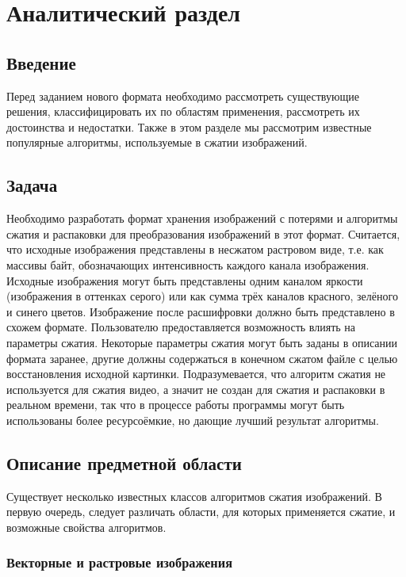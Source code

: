 \documentclass[a4paper,12pt]{article}
\numberwithin{equation}{section}
\begin{document}
\section{Аналитический раздел}

\subsection{Введение}

Перед заданием нового формата необходимо рассмотреть существующие решения,
классифицировать их по областям применения, рассмотреть их достоинства и
недостатки. Также в этом разделе мы рассмотрим известные популярные алгоритмы,
используемые в сжатии изображений.

\subsection{Задача}

Необходимо разработать формат хранения изображений с потерями и алгоритмы сжатия и
распаковки для преобразования изображений в этот формат. Считается, что исходные
изображения представлены в несжатом растровом виде, т.е. как массивы байт,
обозначающих интенсивность каждого канала изображения. Исходные изображения
могут быть представлены одним каналом яркости (изображения в оттенках серого)
или как сумма трёх каналов красного, зелёного и синего цветов. Изображение после
расшифровки должно быть представлено в схожем формате. Пользователю
предоставляется возможность влиять на параметры сжатия. Некоторые параметры
сжатия могут быть заданы в описании формата заранее, другие должны содержаться в
конечном сжатом файле с целью восстановления исходной картинки. Подразумевается,
что алгоритм сжатия не используется для сжатия видео, а значит не создан для
сжатия и распаковки в реальном времени, так что в процессе работы программы
могут быть использованы более ресурсоёмкие, но дающие лучший результат
алгоритмы.

\subsection{Описание предметной области}

Существует несколько известных классов алгоритмов сжатия изображений. В первую
очередь, следует различать области, для которых применяется сжатие, и возможные
свойства алгоритмов.

\subsubsection{Векторные и растровые изображения}
\end{document}
